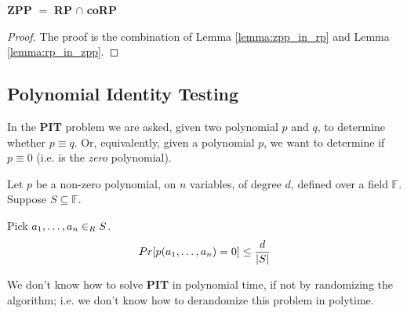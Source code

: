         \begin{theorem}\label{thm:zpp_rp}
            \textbf{ZPP} $=$ \textbf{RP} $\cap$ \textbf{coRP}
        \end{theorem}

        \begin{proof}
            The proof is the combination of Lemma \ref{lemma:zpp_in_rp} and Lemma \ref{lemma:rp_in_zpp}.
        \end{proof}


\subsection{Polynomial Identity Testing}\label{subsec:pit}
    In the \textbf{PIT} problem we are asked, given two polynomial $p$ and $q$, to determine whether $p \equiv q$.
    Or, equivalently, given a polynomial $p$, we want to determine if $p \equiv 0$ (i.e. is the \textit{zero} polynomial).

    \begin{lemma}\label{lemma:schwartz_zippel}
        Let $p$ be a non-zero polynomial, on $n$ variables, of degree $d$, defined over a field $\mathbb{F}$.
        Suppose $S \subseteq \mathbb{F}$.

        Pick $a_1, \dots, a_n \in_R S$.
        \[ Pr [p(a_1, \dots, a_n) = 0] \leq \frac{d}{\vert S \vert} \]
    \end{lemma}

    We don't know how to solve \textbf{PIT} in polynomial time, if not by randomizing the algorithm; i.e. we don't know how to derandomize this problem in polytime.